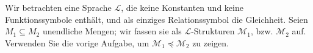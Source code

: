 
\begin{exercise}[204]

Wir betrachten eine Sprache $\mathscr{L}$, die keine Konstanten und keine
Funktionssymbole enthält, und als einziges Relationssymbol die Gleichheit.
Seien $M_1 \subseteq M_2$ unendliche Mengen; wir fassen sie als $\mathscr{L}$-Strukturen
$\mathscr{M}_1$, bzw. $\mathscr{M}_2$ auf. Verwenden Sie die vorige Aufgabe,
um $\mathscr{M}_1 \preccurlyeq \mathscr{M}_2$ zu zeigen.

\end{exercise}


\begin{solution}

  \phantom{}

\end{solution}
